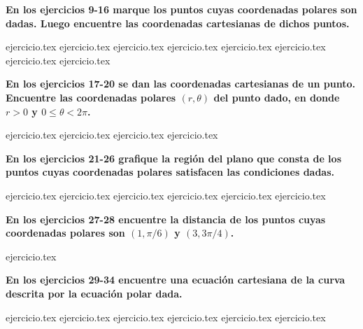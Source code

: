 \vspace{0.3cm}
\noindent\textbf{En los ejercicios 9-16 marque los puntos cuyas coordenadas polares son dadas. Luego encuentre las coordenadas cartesianas de dichos puntos.}
\begin{enumerate}
    \setcounter{enumi}{8}
    {ejercicio.tex}
{ejercicio.tex}
{ejercicio.tex}
{ejercicio.tex}
{ejercicio.tex}
{ejercicio.tex}
{ejercicio.tex}
{ejercicio.tex}
\end{enumerate}

\vspace{0.3cm}
\noindent\textbf{En los ejercicios 17-20 se dan las coordenadas cartesianas de un punto. Encuentre las coordenadas polares $(r, \theta)$ del punto dado, en donde $r > 0$ y $0 \le \theta < 2\pi$.}
\begin{enumerate}
    \setcounter{enumi}{16}
    {ejercicio.tex}
{ejercicio.tex}
{ejercicio.tex}
{ejercicio.tex}
\end{enumerate}

\vspace{0.3cm}
\noindent\textbf{En los ejercicios 21-26 grafique la región del plano que consta de los puntos cuyas coordenadas polares satisfacen las condiciones dadas.}
\begin{enumerate}
    \setcounter{enumi}{20}
    {ejercicio.tex}
{ejercicio.tex}
{ejercicio.tex}
{ejercicio.tex}
{ejercicio.tex}
{ejercicio.tex}
\end{enumerate}

\vspace{0.3cm}
\noindent\textbf{En los ejercicios 27-28 encuentre la distancia de los puntos cuyas coordenadas polares son $(1, \pi/6)$ y $(3, 3\pi/4)$.}
\begin{enumerate}
    \setcounter{enumi}{26}
    {ejercicio.tex}
\end{enumerate}

\vspace{0.3cm}
\noindent\textbf{En los ejercicios 29-34 encuentre una ecuación cartesiana de la curva descrita por la ecuación polar dada.}
\begin{enumerate}
    \setcounter{enumi}{28}
    {ejercicio.tex}
{ejercicio.tex}
{ejercicio.tex}
{ejercicio.tex}
{ejercicio.tex}
{ejercicio.tex}
\end{enumerate}

